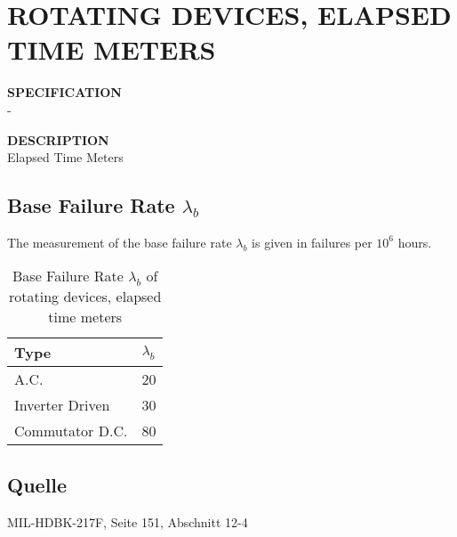 \section{ROTATING DEVICES, ELAPSED TIME METERS}

\begin{minipage}[t]{0.29\textwidth}
    \textbf{SPECIFICATION}\\
    -
\end{minipage}
\begin{minipage}[t]{0.7\textwidth}
    \textbf{DESCRIPTION}\\
    Elapsed Time Meters
\end{minipage}

\subsection{Base Failure Rate $\lambda_b$}
The measurement of the base failure rate $\lambda_b$ is given in failures per $10^6$ hours.
\begin{table}[ht]
{\centering

\begin{tabular}{|p{5cm}|p{1.5cm}|}
    \hline
    \textbf{Type} & \textbf{$\lambda_b$} \\
    \hline
    A.C. & 20 \\
    \hline
    Inverter Driven & 30 \\
    \hline
    Commutator D.C. & 80 \\
    \hline
\end{tabular}

\caption{Base Failure Rate $\lambda_b$ of rotating devices, elapsed time meters}

\label{tab:bfr_rotating_devices_elapsed_time_meters}
\par}
\end{table}
\subsection*{Quelle}
MIL-HDBK-217F, Seite 151, Abschnitt 12-4